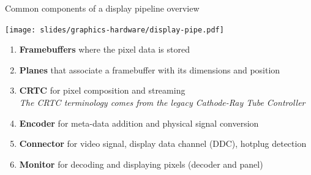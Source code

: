 \begin{frame}{Common components of a display pipeline overview}
  \begin{center}
  \texttt{[image: slides/graphics-hardware/display-pipe.pdf]}
  \end{center}

  \begin{enumerate}
  \item \textbf{Framebuffers} where the pixel data is stored
  \item \textbf{Planes} that associate a framebuffer with its dimensions and position
  \item \textbf{CRTC} for pixel composition and streaming\\
  \textit{The CRTC terminology comes from the legacy Cathode-Ray Tube Controller}
  \item \textbf{Encoder} for meta-data addition and physical signal conversion
  \item \textbf{Connector} for video signal, display data channel (DDC), hotplug detection
  \item \textbf{Monitor} for decoding and displaying pixels (decoder and panel)
  \end{enumerate}
\end{frame}

